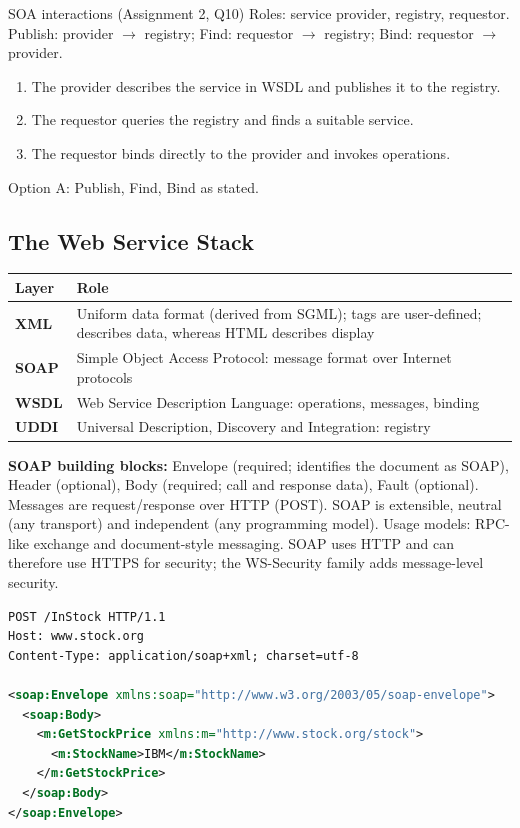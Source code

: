 \begin{solved}{SOA interactions (Assignment 2, Q10)}
\Given Roles: service provider, registry, requestor.
\Formula Publish: provider $\to$ registry; Find: requestor $\to$ registry; Bind: requestor $\to$ provider.
\Steps
\begin{enumerate}[leftmargin=*]
  \item The provider describes the service in WSDL and publishes it to the registry.
  \item The requestor queries the registry and finds a suitable service.
  \item The requestor binds directly to the provider and invokes operations.
\end{enumerate}
\Answer Option A: Publish, Find, Bind as stated.
\end{solved}

\subsection{The Web Service Stack}
\begin{center}
\begin{tabularx}{\textwidth}{>{\bfseries}lX}
\toprule
Layer & Role\\
\midrule
XML & Uniform data format (derived from SGML); tags are user-defined; describes data, whereas HTML describes
display\\
SOAP & Simple Object Access Protocol: message format over Internet protocols\\
WSDL & Web Service Description Language: operations, messages, binding\\
UDDI & Universal Description, Discovery and Integration: registry\\
\bottomrule
\end{tabularx}
\end{center}

\textbf{SOAP building blocks:} Envelope (required; identifies the document as SOAP), Header (optional), Body (required;
call and response data), Fault (optional). Messages are request/response over HTTP (POST). SOAP is extensible, neutral
(any transport) and independent (any programming model). Usage models: RPC-like exchange and document-style messaging.
SOAP uses HTTP and can therefore use HTTPS for security; the WS-Security family adds message-level security.

\begin{lstlisting}[language=XML]
POST /InStock HTTP/1.1
Host: www.stock.org
Content-Type: application/soap+xml; charset=utf-8

<soap:Envelope xmlns:soap="http://www.w3.org/2003/05/soap-envelope">
  <soap:Body>
    <m:GetStockPrice xmlns:m="http://www.stock.org/stock">
      <m:StockName>IBM</m:StockName>
    </m:GetStockPrice>
  </soap:Body>
</soap:Envelope>
\end{lstlisting}

